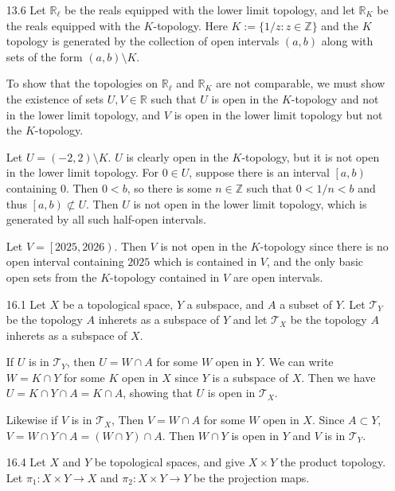 \documentclass[11pt, reqno]{article}
\begin{document}
\begin{enumerate}
    \item[13.6] Let $\mathbb{R}_\ell$ be the reals equipped with the lower limit topology, and let $\mathbb{R}_K$ be 
    the reals equipped with the $K$-topology. Here $K := \{1/z: z \in \mathbb{Z}\}$ and the $K$ topology 
    is generated by the collection of open intervals $(a,b)$ along with sets of the form $(a,b) \setminus K$.

    To show that the topologies on $\mathbb{R}_\ell$ and $\mathbb{R}_K$ are not comparable, we must show the existence
    of sets $U, V \in \mathbb{R}$ such that $U$ is open in the $K$-topology and not in the lower limit topology, and
    $V$ is open in the lower limit topology but not the $K$-topology. 

    Let $U = (-2,2) \setminus K$. $U$ is clearly open in the $K$-topology, but it is not open in the lower limit
    topology. For $0 \in U$, suppose there is an interval $\left[a,b\right)$ containing $0$. Then $0 < b$, 
    so there is some $n \in \mathbb{Z}$ such that $0 < 1/n < b$ and thus $\left[a,b\right) \not\subset U$. Then 
    $U$ is not open in the lower limit topology, which is generated by all such half-open intervals. 

    Let $V = \left[2025, 2026\right)$. Then $V$ is not open in the $K$-topology since there is no open interval
    containing $2025$ which is contained in $V$, and the only basic open sets from the $K$-topology contained in 
    $V$ are open intervals. 

    \item[16.1] Let $X$ be a topological space, $Y$ a subspace, and $A$ a subset of $Y$. Let $\mathcal{T}_Y$ be
    the topology $A$ inherets as a subspace of $Y$ and let $\mathcal{T}_X$ be the topology $A$ inherets as a subspace 
    of $X$. 

    If $U$ is in $\mathcal{T}_Y$, then $U = W \cap A$ for some $W$ open in $Y$. We can write $W = K \cap Y$ for some
    $K$ open in $X$ since $Y$ is a subspace of $X$. Then we have $U = K \cap Y \cap A = K \cap A$, showing that $U$
    is open in $\mathcal{T}_X$. 

    Likewise if $V$ is in $\mathcal{T}_X$, Then $V = W \cap A$ for some $W$ open in $X$. Since $A \subset Y$, 
    $V = W \cap Y \cap A = (W \cap Y) \cap A$. Then $W \cap Y$ is open in $Y$ and $V$ is in $\mathcal{T}_Y$.

    \item[16.4] Let $X$ and $Y$ be topological spaces, and give $X \times Y$ the product topology. 
    Let $\pi_1: X \times Y \rightarrow X$ and $\pi_2: X \times Y \rightarrow Y$ be the projection maps.


\end{enumerate}
\end{document}
